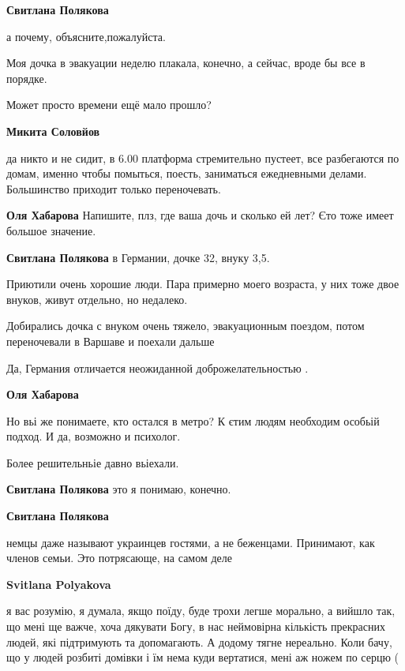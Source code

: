 \begin{itemize}
\begin{itemize}
\textbf{Свитлана Полякова} 

а почему, объясните,пожалуйста.

Моя дочка в эвакуации неделю плакала, конечно, а сейчас, вроде бы все в
порядке.

Может просто времени ещё мало прошло?

\textbf{Микита Соловйов} 

да никто и не сидит, в 6.00 платформа стремительно пустеет, все разбегаются по
домам, именно чтобы помыться, поесть, заниматься ежедневными делами.
Большинство приходит только переночевать.

\textbf{Оля Хабарова} Напишите, плз, где ваша дочь и сколько ей лет?
Єто тоже имеет большое значение.

\textbf{Свитлана Полякова} в Германии, дочке 32, внуку 3,5.

Приютили очень хорошие люди. Пара примерно моего возраста, у них тоже двое
внуков, живут отдельно, но недалеко.

Добирались дочка с внуком очень тяжело, эвакуационным поездом, потом
переночевали в Варшаве и поехали дальше

Да, Германия отличается неожиданной доброжелательностью .

\textbf{Оля Хабарова} 

Но вьі же понимаете, кто остался в метро? К єтим людям необходим особьій
подход. И да, возможно и психолог.

Более решительньіе давно вьіехали.

\textbf{Свитлана Полякова} это я понимаю, конечно.

\textbf{Свитлана Полякова} 

немцы даже называют украинцев гостями, а не беженцами. Принимают, как членов
семьи. Это потрясающе, на самом деле

\textbf{Svitlana Polyakova} 

я вас розумію, я думала, якщо поїду, буде трохи легше морально, а вийшло так,
що мені ще важче, хоча дякувати Богу, в нас неймовірна кількість прекрасних
людей, які підтримують та допомагають. А додому тягне нереально. Коли бачу, що
у людей розбиті домівки і їм нема куди вертатися, мені аж ножем по серцю (

\end{itemize} %


\end{itemize}
